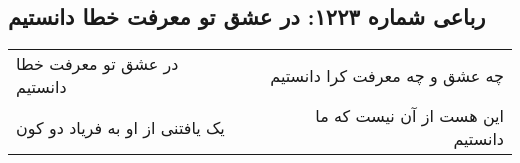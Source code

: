 \begin{center}
\section*{رباعی شماره ۱۲۲۳: در عشق تو معرفت خطا دانستیم}
\label{sec:1223}
\begin{longtable}{l p{0.5cm} r}
در عشق تو معرفت خطا دانستیم
&&
چه عشق و چه معرفت کرا دانستیم
\\
یک یافتنی از او به فریاد دو کون
&&
این هست از آن نیست که ما دانستیم
\\
\end{longtable}
\end{center}
